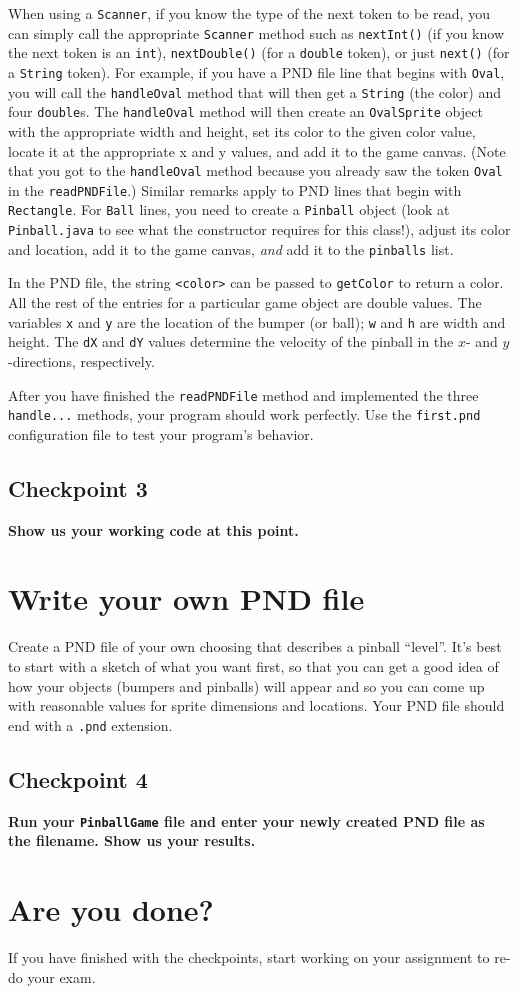\documentclass[12pt]{article}
\newcommand{\code}{\texttt}
\newcommand{\fname}{\texttt}
\begin{document}
When using a \verb'Scanner',
if you know the type of the next token to be read,
you can simply call the appropriate \verb'Scanner' method such as
\verb'nextInt()' (if you know the next token is an \verb'int'),
\verb'nextDouble()' (for a \verb'double' token),
or just \verb'next()' (for a \verb'String' token).
For example, if you have a PND file line that begins with \verb'Oval',
you will call the \verb'handleOval'
method that will then get a \verb'String' (the color)
and four \verb'double's.
The \verb'handleOval' method will then
create an \verb'OvalSprite' object with the appropriate width and height,
set its color to the given color value,
locate it at the appropriate x and y values,
and add it to the game canvas.
(Note that you got to the \verb'handleOval' method
because you already saw the token \verb'Oval'
in the \verb'readPNDFile'.)
Similar remarks apply to PND lines that begin with \verb'Rectangle'.
For \verb'Ball' lines,
you need to create a \verb'Pinball' object
(look at \verb'Pinball.java' to see what the constructor requires
for this class!),
adjust its color and location,
add it to the game canvas,
{\em and} add it to the \verb'pinballs' list.

In the PND file, the string \code{<color>} can be passed to \code{getColor}
to return a color.
All the rest of the entries for a particular game object
are double values.
The variables \code{x} and \code{y} are the
location of the bumper (or ball);
\code{w} and \code{h} are width and height.
The \code{dX}
and \code{dY} values determine the velocity of the pinball
in the $x$- and $y$-directions, respectively.

After you have finished the \code{readPNDFile} method
and implemented the three \verb'handle...' methods,
your program should work perfectly.
Use the \fname{first.pnd} configuration file
to test your program's behavior.

\subsection*{Checkpoint 3}
{\bf
Show us your working code at this point.
}

\section*{Write your own PND file}
Create a PND file of your own choosing
that describes a pinball ``level''.
It's best to start with a sketch of what you want first,
so that you can get a good idea of how your objects
(bumpers and pinballs) will appear
and so you can come up with reasonable values for
sprite dimensions and locations.
Your PND file should end with a \fname{.pnd} extension.

\subsection*{Checkpoint 4}
{\bf
Run your \verb'PinballGame' file
and enter your newly created PND file as the filename.
Show us your results.
}

\section*{Are you done?}
If you have finished with the checkpoints,
start working on your assignment to re-do your exam.
\end{document}
